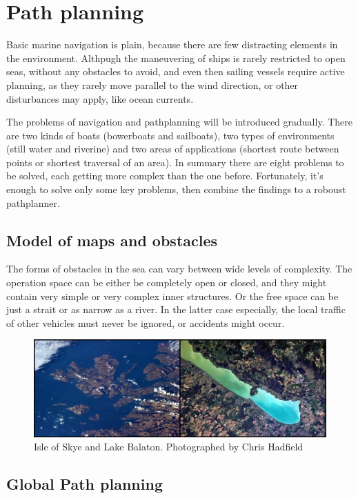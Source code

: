 \section{Path planning} 

Basic marine navigation is plain, because there are few distracting elements in the environment. Althpugh the maneuvering of ships is rarely restricted to open seas, without any obstacles to avoid, and even then sailing vessels require active planning, as they rarely move parallel to the wind direction, or other disturbances may apply, like ocean currents.

The problems of navigation and pathplanning will be introduced gradually. There are two kinds of boats (bowerboats and sailboats), two types of environments (still water and riverine) and two areas of applications (shortest route between points or shortest traversal of an area). In summary there are eight problems to be solved, each getting more complex than the one before. Fortunately, it's enough to solve only some key problems, then combine the findings to a roboust pathplanner.

\subsection{Model of maps and obstacles}

The forms of obstacles in the sea can vary between wide levels of complexity. The operation space can be either be completely open or closed, and they might contain very simple or very complex inner structures. Or the free space can be just a strait or as narrow as a river. In the latter case especially, the local traffic of other vehicles must never be ignored, or accidents might occur.

\begin{figure}[H]
	\centering
	\includegraphics[width=\textwidth]{pics/hadfield}
	\caption{Isle of Skye and Lake Balaton. Photographed by Chris Hadfield}
	\label{fig:linemap}
\end{figure}

\subsection{Global Path planning}

